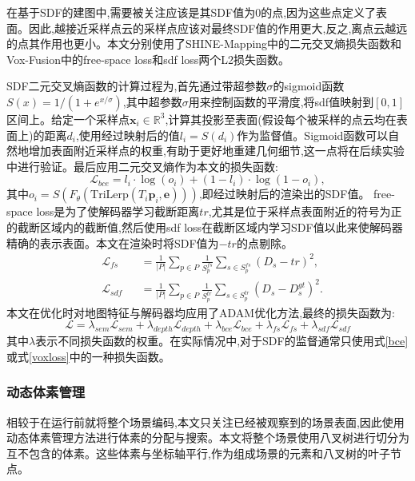 在基于SDF的建图中,需要被关注应该是其SDF值为0的点,因为这些点定义了表面。因此,越接近采样点云的采样点应该对最终SDF值的作用更大,反之,离点云越远的点其作用也更小。本文分别使用了SHINE-Mapping中的二元交叉熵损失函数和Vox-Fusion中的free-space loss和sdf loss两个L2损失函数。

SDF二元交叉熵函数的计算过程为,首先通过带超参数$\sigma$的sigmoid函数$S(x) = 1/(1 + e^{x/\sigma})$,其中超参数$\sigma$用来控制函数的平滑度,将sdf值映射到$[0,1]$区间上。给定一个采样点$\mathbf{x}_i\in \mathbb{R}^3$,计算其投影至表面(假设每个被采样的点云均在表面上)的距离$d_i$,使用经过映射后的值$l_i=S(d_i)$作为监督值。Sigmoid函数可以自然地增加表面附近采样点的权重,有助于更好地重建几何细节,这一点将在后续实验中进行验证。最后应用二元交叉熵作为本文的损失函数:
\begin{equation}
    \mathcal{L}_{bce} = l_i\cdot \log(o_i)+(1-l_i)\cdot\log(1-o_i),\label{bce}
\end{equation}
其中$o_i=S(F_\theta(\mbox{TriLerp}(T_i\mathbf{p}_i,\mathbf{e})))$,即经过映射后的渲染出的SDF值。
free-space loss是为了使解码器学习截断距离$tr$,尤其是位于采样点表面附近的符号为正的截断区域内的截断值,然后使用sdf loss在截断区域内学习SDF值以此来使解码器精确的表示表面。本文在渲染时将SDF值为$-tr$的点剔除。
\begin{equation}
    \begin{alignedat}{2}
        &\mathcal{L}_{fs} &&= \frac{1}{|P|}\sum_{p\in P}\frac{1}{S_p^{fs}}\sum_{s\in S_p^{fs}}(D_s-tr)^2,\\
    &\mathcal{L}_{sdf} &&= \frac{1}{|P|}\sum_{p\in P}\frac{1}{S_p^{tr}}\sum_{s\in S_p^{tr}}(D_s-D_s^{gt})^2.\label{voxloss}
    \end{alignedat}
\end{equation}
本文在优化时对地图特征与解码器均应用了ADAM\cite{adam}优化方法,最终的损失函数为:
\begin{equation}
    \mathcal{L} = \lambda_{sem}\mathcal{L}_{sem}+\lambda_{depth}\mathcal{L}_{depth}+\lambda_{bce}\mathcal{L}_{bce}+\lambda_{fs}\mathcal{L}_{fs}+\lambda_{sdf}\mathcal{L}_{sdf}
\end{equation}
其中$\lambda$表示不同损失函数的权重。在实际情况中,对于SDF的监督通常只使用式\ref{bce}或式\ref{voxloss}中的一种损失函数。
\subsubsection{动态体素管理}
相较于在运行前就将整个场景编码,本文只关注已经被观察到的场景表面,因此使用动态体素管理方法进行体素的分配与搜索。本文将整个场景使用八叉树进行切分为互不包含的体素。这些体素与坐标轴平行,作为组成场景的元素和八叉树的叶子节点。

